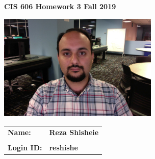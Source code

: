 \documentclass[11pt]{article}
\begin{document}
\thispagestyle{plain}

\begin{center}
{\Large \bf CIS 606 \hfil Homework 3 \hfil Fall 2019} \\
\end{center}

\vskip 1in 

\centerline{\includegraphics[width=3in]{photo.jpg}}

\vskip 0.5in 


\begin{center}
\begin{tabular}{ll}
{\bf Name:}     & {\bf Reza Shisheie } \\ \\
{\bf Login ID:} & {\bf reshishe }   
\end{tabular}
\end{center}

\newpage
\end{document}
